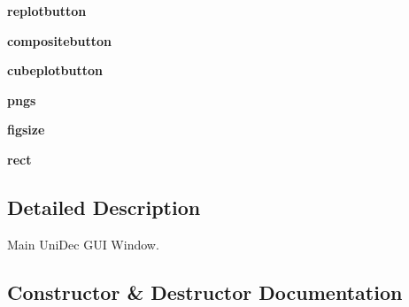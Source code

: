 \begin{DoxyCompactItemize}
\item 
\hypertarget{class_uni_dec_1_1unidec__modules_1_1mainwindow_1_1_mainwindow_a2d100921c4947eebf33998cdb3e265e9}{}{\bfseries replotbutton}\label{class_uni_dec_1_1unidec__modules_1_1mainwindow_1_1_mainwindow_a2d100921c4947eebf33998cdb3e265e9}

\item 
\hypertarget{class_uni_dec_1_1unidec__modules_1_1mainwindow_1_1_mainwindow_ad0ca6a2d400d56c321dc29b84a198086}{}{\bfseries compositebutton}\label{class_uni_dec_1_1unidec__modules_1_1mainwindow_1_1_mainwindow_ad0ca6a2d400d56c321dc29b84a198086}

\item 
\hypertarget{class_uni_dec_1_1unidec__modules_1_1mainwindow_1_1_mainwindow_af2207b39a28913d594d6da3c639baa8b}{}{\bfseries cubeplotbutton}\label{class_uni_dec_1_1unidec__modules_1_1mainwindow_1_1_mainwindow_af2207b39a28913d594d6da3c639baa8b}

\item 
\hypertarget{class_uni_dec_1_1unidec__modules_1_1mainwindow_1_1_mainwindow_a4ba73ba6ee2c0d4d9e5ab7026fac36e9}{}{\bfseries pngs}\label{class_uni_dec_1_1unidec__modules_1_1mainwindow_1_1_mainwindow_a4ba73ba6ee2c0d4d9e5ab7026fac36e9}

\item 
\hypertarget{class_uni_dec_1_1unidec__modules_1_1mainwindow_1_1_mainwindow_a945ef7ae6600f8f39f2c149b52839a64}{}{\bfseries figsize}\label{class_uni_dec_1_1unidec__modules_1_1mainwindow_1_1_mainwindow_a945ef7ae6600f8f39f2c149b52839a64}

\item 
\hypertarget{class_uni_dec_1_1unidec__modules_1_1mainwindow_1_1_mainwindow_a7def26005399043bf5a81350e3f348a7}{}{\bfseries rect}\label{class_uni_dec_1_1unidec__modules_1_1mainwindow_1_1_mainwindow_a7def26005399043bf5a81350e3f348a7}

\end{DoxyCompactItemize}


\subsection{Detailed Description}
\begin{DoxyVerb}Main UniDec GUI Window.
\end{DoxyVerb}
 

\subsection{Constructor \& Destructor Documentation}
\hypertarget{class_uni_dec_1_1unidec__modules_1_1mainwindow_1_1_mainwindow_ab854ca6e4c994de7f2ef52256112cd64}{}
